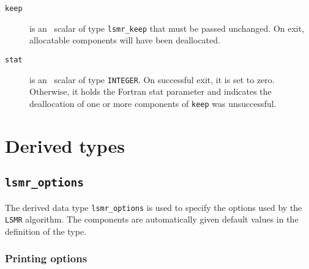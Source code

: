 \begin{description}

\item[\texttt{keep}] is an \intentinout\ scalar  of type {\tt lsmr\_keep}
that must be passed unchanged.
On exit, allocatable components will have been deallocated.

\item[\texttt{stat}] is an \intentout\ scalar of type {\tt INTEGER}.
On successful exit, it is set to zero. Otherwise, it holds the Fortran stat
parameter and indicates the deallocation of one or more components of
{\tt keep} was unsuccessful.

\end{description}




\section{Derived types}
\subsection{\texttt{lsmr\_options}}
\label{LSMR:type:options}

The derived data type {\tt lsmr\_options} is used to specify the options used
by the \texttt{LSMR} algorithm. The components are automatically
given default values in the definition of the type.

\subsubsection*{Printing options}

